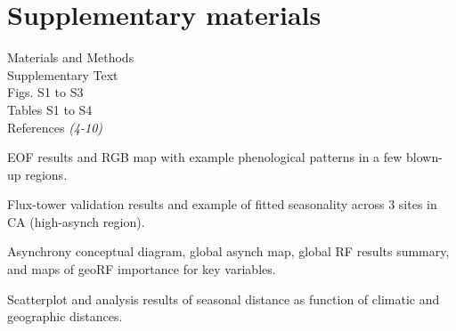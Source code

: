 \documentclass[12pt]{article}
\begin{document}
\section*{Supplementary materials}
Materials and Methods\\
Supplementary Text\\
Figs. S1 to S3\\
Tables S1 to S4\\
References \textit{(4-10)}




\clearpage

 EOF results and RGB map with example phenological patterns in a few blown-up regions.

 Flux-tower validation results and example of fitted seasonality across 3 sites in CA (high-asynch region).

 Asynchrony conceptual diagram, global asynch map, global RF results summary, and maps of geoRF importance for key variables.

 Scatterplot and analysis results of seasonal distance as function of climatic and geographic distances.
\end{document}
